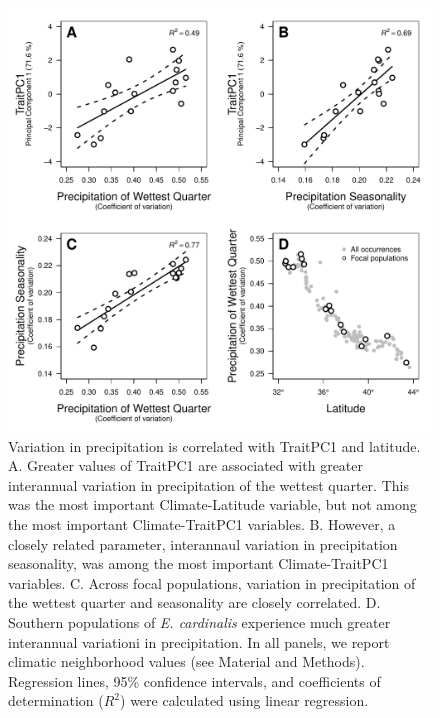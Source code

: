 \documentclass[11pt, oneside]{article}
\begin{document}
\begin{figure}[h!]
	\label{fig:Fig_ClimVarImp}
\end{figure}


\begin{figure}[h!]
	\centerline{\includegraphics[width=1\textwidth]{Figures/Figure_ClimPC1.pdf}}
	\fontsize{10}{12}
	\selectfont
	\caption[Variation in precipitation is correlated with TraitPC1 and latitude]{Variation in precipitation is correlated with TraitPC1 and latitude. A. Greater values of TraitPC1 are associated with greater interannual variation in precipitation of the wettest quarter. This was the most important Climate-Latitude variable, but not among the most important Climate-TraitPC1 variables. B. However, a closely related parameter, interannaul variation in precipitation seasonality, was among the most important Climate-TraitPC1 variables. C. Across focal populations, variation in precipitation of the wettest quarter and seasonality are closely correlated. D. Southern populations of \textit{E. cardinalis} experience much greater interannual variationi in precipitation. In all panels, we report climatic neighborhood values (see Material and Methods). Regression lines, 95\% confidence intervals, and coefficients of determination ($R^2$) were calculated using linear regression.}
	\label{fig:Fig_ClimPC1}
\end{figure}
\end{document}
